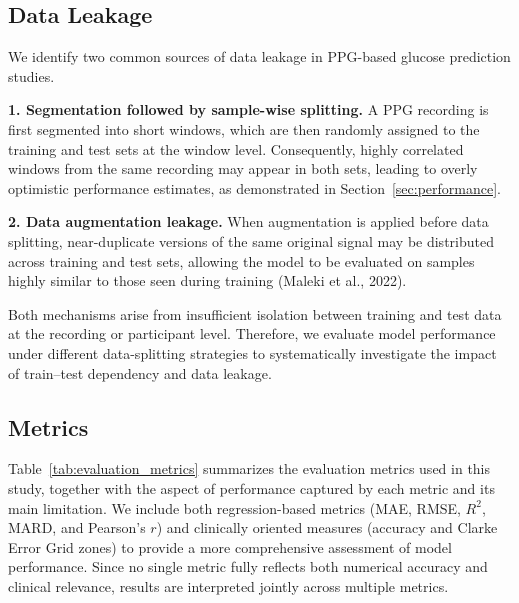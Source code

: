 \documentclass{article}
\begin{document}
\subsection{Data Leakage}
\label{sec:data_leakage_methods}

We identify two common sources of data leakage in PPG-based glucose prediction studies.

\textbf{1. Segmentation followed by sample-wise splitting.}
A PPG recording is first segmented into short windows, which are then randomly assigned to the training and test sets at the window level. Consequently, highly correlated windows from the same recording may appear in both sets, leading to overly optimistic performance estimates, as demonstrated in Section~\ref{sec:performance}.

\textbf{2. Data augmentation leakage.}
When augmentation is applied before data splitting, near-duplicate versions of the same original signal may be distributed across training and test sets, allowing the model to be evaluated on samples highly similar to those seen during training (Maleki et al., 2022).

Both mechanisms arise from insufficient isolation between training and test data at the recording or participant level. Therefore, we evaluate model performance under different data-splitting strategies to systematically investigate the impact of train--test dependency and data leakage.

\subsection{Metrics}
Table~\ref{tab:evaluation_metrics} summarizes the evaluation metrics used in this study, together with the aspect of performance captured by each metric and its main limitation. We include both regression-based metrics (MAE, RMSE, $R^2$, MARD, and Pearson's $r$) and clinically oriented measures (accuracy and Clarke Error Grid zones) to provide a more comprehensive assessment of model performance. Since no single metric fully reflects both numerical accuracy and clinical relevance, results are interpreted jointly across multiple metrics.
\end{document}

